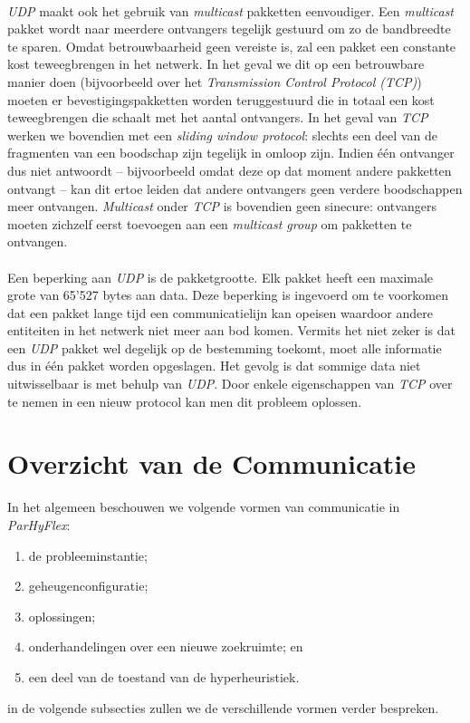 \paragraph{}
\emph{UDP} maakt ook het gebruik van \emph{multicast} pakketten eenvoudiger. Een \emph{multicast} pakket wordt naar meerdere ontvangers tegelijk gestuurd om zo de bandbreedte te sparen. Omdat betrouwbaarheid geen vereiste is, zal een pakket een constante kost teweegbrengen in het netwerk. In het geval we dit op een betrouwbare manier doen (bijvoorbeeld over het \emph{Transmission Control Protocol (TCP)}) moeten er bevestigingspakketten worden teruggestuurd die in totaal een kost teweegbrengen die schaalt met het aantal ontvangers. In het geval van \emph{TCP} werken we bovendien met een \emph{sliding window protocol}: slechts een deel van de fragmenten van een boodschap zijn tegelijk in omloop zijn. Indien \'e\'en ontvanger dus niet antwoordt -- bijvoorbeeld omdat deze op dat moment andere pakketten ontvangt -- kan dit ertoe leiden dat andere ontvangers geen verdere boodschappen meer ontvangen. \emph{Multicast} onder \emph{TCP} is bovendien geen sinecure\cite{dshp}: ontvangers moeten zichzelf eerst toevoegen aan een \emph{multicast group} om pakketten te ontvangen.

\paragraph{}
Een beperking aan \emph{UDP} is de pakketgrootte. Elk pakket heeft een maximale grote van 65'527 bytes aan data. Deze beperking is ingevoerd om te voorkomen dat een pakket lange tijd een communicatielijn kan opeisen waardoor andere entiteiten in het netwerk niet meer aan bod komen\cite{Tanen2003}. Vermits het niet zeker is dat een \emph{UDP} pakket wel degelijk op de bestemming toekomt, moet alle informatie dus in \'e\'en pakket worden opgeslagen. Het gevolg is dat sommige data niet uitwisselbaar is met behulp van \emph{UDP}. Door enkele eigenschappen van \emph{TCP} over te nemen in een nieuw protocol kan men dit probleem oplossen.

\section{Overzicht van de Communicatie}

In het algemeen beschouwen we volgende vormen van communicatie in \emph{ParHyFlex}:
\begin{enumerate}
 \item de probleeminstantie;
 \item geheugenconfiguratie;
 \item oplossingen;
 \item onderhandelingen over een nieuwe zoekruimte; en
 \item een deel van de toestand van de hyperheuristiek.
\end{enumerate}
in de volgende subsecties zullen we de verschillende vormen verder bespreken.

